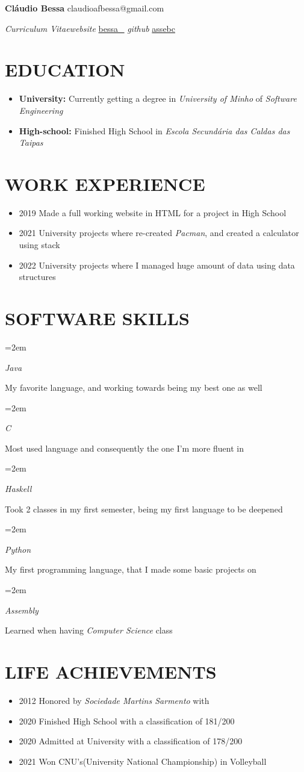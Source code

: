 \documentclass[paper=a4,fontsize=11pt]{scrartcl} %
\newlength{\spacebox}
\newcommand{\sepspace}{\vspace*{0.5em}}		%
\newcommand{\NameEmailPhoneSiteGithub}[5]{
    \Huge \usefont{OT1}{phv}{m}{n} \textbf{#1}
    \large \usefont{OT1}{phv}{m}{n} \hfill #2\hspace{25pt}#3

    \textit{Curriculum Vitae}\hfill \textit{website } #4 \hspace{25pt}\textit{github } #5
    \par \normalsize \normalfont
}
\newcommand{\NewPart}[1]{\section*{\uppercase{#1}}}
\newcommand{\SkillsEntry}[2]{      %
    \noindent\hangindent=2em\hangafter=0 %
    \parbox{\spacebox}{        %
        \textit{#1}}			   %
    \hspace{1.5em} #2 \par}    %
\begin{document}
    \NameEmailPhoneSiteGithub{Cláudio Bessa}{               }{claudioafbessa@gmail.com}
    {\href{https://www.youtube.com/channel/UCKz1tkzbzC6SV9CYF7qRE3g}{bessa_}}
    {\href{https://github.com/assebc}{assebc}}

    \sepspace

    \NewPart{Education}{}
    \begin{itemize}
        \item[] \textbf{University:} Currently getting a degree in \textit{University of Minho} of \textit{Software Engineering}
        \item[] \textbf{High-school:} Finished High School in \textit{Escola Secundária das Caldas das Taipas}
    \end{itemize}

    \sepspace

    \NewPart{Work Experience}{}

    \begin{itemize}
        \item[] 2019 Made a full working website in HTML for a project in High School
        \item[] 2021 University projects where re-created \textit{Pacman}, and created a calculator using stack
        \item[] 2022 University projects where I managed huge amount of data using data structures
    \end{itemize}

    \sepspace

    \NewPart{Software Skills}{}

    \SkillsEntry{Java}{My favorite language, and working towards being my best one as well}
    \SkillsEntry{C}{Most used language and consequently the one I'm more fluent in}
    \SkillsEntry{Haskell}{Took 2 classes in my first semester, being my first language to be deepened}
    \SkillsEntry{Python}{My first programming language, that I made some basic projects on}
    \SkillsEntry{Assembly}{Learned when having \textit{Computer Science} class}


    \NewPart{Life Achievements}{}

    \begin{itemize}
        \item[] 2012 Honored by \textit{Sociedade Martins Sarmento} with
        \item[] 2020 Finished High School with a classification of 181/200
        \item[] 2020 Admitted at University with a classification of 178/200
        \item[] 2021 Won CNU's(University National Championship) in Volleyball
    \end{itemize}
\end{document}
